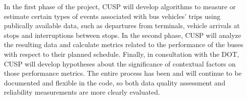 \documentclass[12pt,journal,compsoc]{IEEEtran}
\begin{document}
In the first phase of the project, CUSP will develop algorithms to measure or estimate certain types of events associated with bus vehicles’ trips using publically­ available data, such as departures from terminals, vehicle arrivals at stops and interruptions between stops.  
In the second phase, CUSP will analyze the resulting data and calculate metrics related to the performance of the buses with respect to their planned schedule.  Finally, in consultation with the DOT, CUSP will develop hypotheses about the significance of contextual factors on those performance metrics.
The entire process has been and will continue to be documented and flexible in the code, so both data quality assessment and reliability measurements are more clearly evaluated.


%
%



%
%
\end{document}
